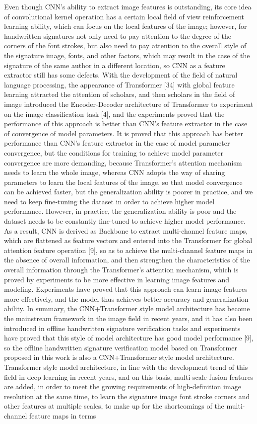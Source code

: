 Even though CNN's ability to extract image features is outstanding, its core idea of convolutional kernel operation has a certain local field of view reinforcement learning ability, which can focus on the local features of the image; however, for handwritten signatures not only need to pay attention to the degree of the corners of the font strokes, but also need to pay attention to the overall style of the signature image, fonts, and other factors, which may result in the case of the signature of the same author in a different location, so CNN as a feature extractor still has some defects. With the development of the field of natural language processing, the appearance of Transformer [34] with global feature learning attracted the attention of scholars, and then scholars in the field of image introduced the Encoder-Decoder architecture of Transformer to experiment on the image classification task [4], and the experiments proved that the performance of this approach is better than CNN's feature extractor in the case of convergence of model parameters. It is proved that this approach has better performance than CNN's feature extractor in the case of model parameter convergence, but the conditions for training to achieve model parameter convergence are more demanding, because Transformer's attention mechanism needs to learn the whole image, whereas CNN adopts the way of sharing parameters to learn the local features of the image, so that model convergence can be achieved faster, but the generalization ability is poorer in practice, and we need to keep fine-tuning the dataset in order to achieve higher model performance. However, in practice, the generalization ability is poor and the dataset needs to be constantly fine-tuned to achieve higher model performance. As a result, CNN is derived as Backbone to extract multi-channel feature maps, which are flattened as feature vectors and entered into the Transformer for global attention feature operation [9], so as to achieve the multi-channel feature maps in the absence of overall information, and then strengthen the characteristics of the overall information through the Transformer's attention mechanism, which is proved by experiments to be more effective in learning image features and modeling. Experiments have proved that this approach can learn image features more effectively, and the model thus achieves better accuracy and generalization ability. In summary, the CNN+Transformer style model architecture has become the mainstream framework in the image field in recent years, and it has also been introduced in offline handwritten signature verification tasks and experiments have proved that this style of model architecture has good model performance [9], so the offline handwritten signature verification model based on Transformer proposed in this work is also a CNN+Transformer style model architecture. Transformer style model architecture, in line with the development trend of this field in deep learning in recent years, and on this basis, multi-scale fusion features are added, in order to meet the growing requirements of high-definition image resolution at the same time, to learn the signature image font stroke corners and other features at multiple scales, to make up for the shortcomings of the multi-channel feature maps in terms 